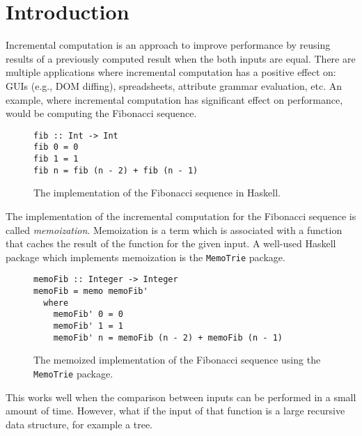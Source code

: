 \chapter{Introduction}



Incremental computation is an approach to improve performance by reusing results of a previously computed result when the both inputs are equal. There are multiple applications where incremental computation has a positive effect on: GUIs (e.g., DOM diffing), spreadsheets, attribute grammar evaluation, etc.  An example, where incremental computation has significant effect on performance, would be computing the Fibonacci sequence.

\begin{figure}[H]
\captionsetup{justification=justified,singlelinecheck=false,margin=0cm}
\begin{verbatim}
fib :: Int -> Int
fib 0 = 0
fib 1 = 1
fib n = fib (n - 2) + fib (n - 1)
\end{verbatim}
\caption{The implementation of the Fibonacci sequence in Haskell.}
\label{fig-fib-alg}
\end{figure}

The implementation of the incremental computation for the Fibonacci sequence is called \textit{memoization}. Memoization is a term which is associated with a function that caches the result of the function for the given input. A well-used Haskell package which implements memoization is the \texttt{MemoTrie} package\cite*{hackage2022memotrie}.

\begin{figure}[H]
\captionsetup{justification=justified,singlelinecheck=false,margin=0cm}
\begin{verbatim}
memoFib :: Integer -> Integer
memoFib = memo memoFib'
  where
    memoFib' 0 = 0
    memoFib' 1 = 1
    memoFib' n = memoFib (n - 2) + memoFib (n - 1)
\end{verbatim}
\caption{The memoized implementation\cite*{memotrie2022fibonacci} of the Fibonacci sequence using the \texttt{MemoTrie} package.}
\label{fig-mem-fib-alg}
\end{figure}

This works well when the comparison between inputs can be performed in a small amount of time. However, what if the input of that function is a large recursive data structure, for example a tree. 

